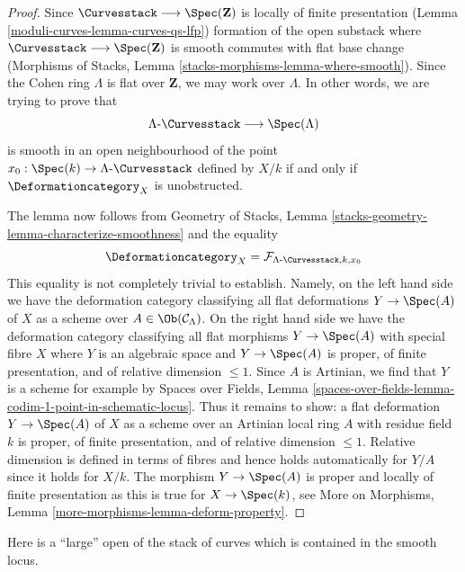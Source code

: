 \begin{proof}
Since $\Curvesstack \longrightarrow \Spec(\mathbf{Z})$ is locally
of finite presentation (Lemma \ref{moduli-curves-lemma-curves-qs-lfp})
formation of the open substack where
$\Curvesstack \longrightarrow \Spec(\mathbf{Z})$ is smooth commutes with
flat base change
(Morphisms of Stacks, Lemma \ref{stacks-morphisms-lemma-where-smooth}).
Since the Cohen ring $\Lambda$ is flat over $\mathbf{Z}$,
we may work over $\Lambda$. In other words, we are trying to prove that
$$
\Lambda\text{-}\Curvesstack \longrightarrow \Spec(\Lambda)
$$
is smooth in an open neighbourhood of the point
$x_0 : \Spec(k) \to \Lambda\text{-}\Curvesstack$
defined by $X/k$ if and only if $\Deformationcategory_X$ is unobstructed.

\medskip\noindent
The lemma now follows from
Geometry of Stacks, Lemma \ref{stacks-geometry-lemma-characterize-smoothness}
and the equality
$$
\Deformationcategory_X =
\mathcal{F}_{\Lambda\text{-}\Curvesstack, k, x_0}
$$
This equality is not completely trivial to establish. Namely, on the left
hand side we have the deformation category classifying all flat deformations
$Y \to \Spec(A)$ of $X$ as a scheme over $A \in \Ob(\mathcal{C}_\Lambda)$.
On the right hand side we have the deformation category classifying all
flat morphisms $Y \to \Spec(A)$ with special fibre $X$
where $Y$ is an algebraic space and
$Y \to \Spec(A)$ is proper, of finite presentation, and of
relative dimension $\leq 1$. Since $A$ is Artinian, we find
that $Y$ is a scheme for example by Spaces over Fields, Lemma
\ref{spaces-over-fields-lemma-codim-1-point-in-schematic-locus}.
Thus it remains to show: a flat deformation $Y \to \Spec(A)$ of
$X$ as a scheme over an Artinian local ring $A$ with residue field $k$
is proper, of finite presentation, and of relative dimension $\leq 1$.
Relative dimension is defined in terms of fibres and hence holds
automatically for $Y/A$ since it holds for $X/k$.
The morphism $Y \to \Spec(A)$ is proper and locally of finite presentation
as this is true for $X \to \Spec(k)$, see
More on Morphisms, Lemma \ref{more-morphisms-lemma-deform-property}.
\end{proof}

Here is a ``large'' open of the stack of curves which is contained
in the smooth locus.

